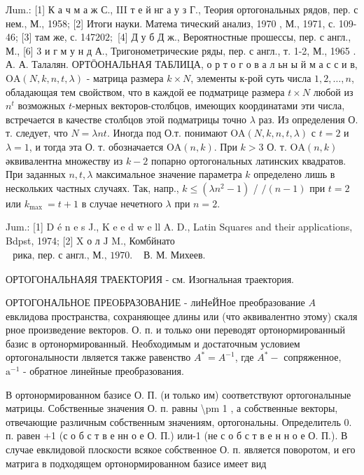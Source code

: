 \documentclass[10pt]{article}
\begin{document}
Лum.: [1] К а ч м а ж С., III т е й нг а у з Г., Теория ортогональных рядов, пер. с нем., М., 1958; [2] Итоги науки. Матема тический анализ, 1970 , М., 1971, с. 109-46; [3] там же, с. 147$202 ;$ [4] Д у б Д ж., Вероятностные прошессы, пер. с англ., М., [6] 3 и г м у н д А., Тригонометрические ряды, пер. с англ., т. 1-2, М., 1965 . А. А. Талалян. ОРТӦОНАЛЬНАЯ ТАБЛИЦА, о р т о г о в а л ьн ы й м а с с и в, $\mathrm{OA}(N, k, n, t, \lambda)$ - матрица размера $k \times N$, элементы к-рой суть числа $1,2, \ldots, n$, обладающая тем свойством, что в каждой ее подматрице размера $t \times N$ любой из $n^{t}$ возможных $t$-мерных векторов-столбцов, имеющих координатами эти числа, встречается в качестве столбцов этой подматрицы точно $\lambda$ раз. Из определения О. т. следует, что $N=\lambda n t$. Иногда под О.т. понимают $\mathrm{OA}(N, k, n, t, \lambda)$ с $t=2$ и $\lambda=1$, и тогда эта О. т. обозначается $\mathrm{OA}(n, k)$. При $k>3$ О. т. $\mathrm{OA}(n, k)$ әквивалентна множеству из $k-2$ попарно ортогональных латинских квадратов. При заданных $n, t, \lambda$ максимальное значение параметра $k$ определено лишь в нескольких частных случаях. Так, напр., $k \leqslant\left(\lambda n^{2}-1\right)$ / $/(n-1)$ при $t=2$ или $k_{\text {max }}=t+1$ в случае нечетного $\lambda$ при $n=2$.



Jum.: [1] D é n e s J., K e e d w e ll A. D., Latin Squares and their applications, Bdpst, 1974; [2] X о л $\mathrm{J}$ M., Комбйнато$\begin{array}{ll}\text { рика, пер. с англ., М., } 1970 . & \text { В. М. Михеев. }\end{array}$



ОРТОГОНАЛЬНАЯЯ ТРАЕКТОРИЯ - см. Изогнальная траектория.



ОРТОГОНАЛЬНОЕ ПРЕОБРАЗОВАНИЕ - лиНеЙНое преобразование $A$ евклидова пространства, сохраняющее длины или (что әквивалентно этому) скаля рное произведение векторов. О. п. и только они переводят ортонормированный базис в ортонормированный. Необходимым и достаточным условием ортогоналыности лвляется также равенство $A^{*}=A^{-1}$, где $A^{*}-$ сопряженное, $\mathrm{a}^{-1}$ - обратное линейные преобразования.



В ортонормированном базисе О. П. (и только им) соответствуют ортогоналыные матрицы. Собственные значения О. п. равны \textbackslash pm 1 , а собственные векторы, отвечающие различным собственным значениям, ортогональны. Определитель 0. п. равен +1 (с о б с т в е нн о е О. П.) или-1 (не с о б с т в е н н о е О. П.). В случае евклидовой плоскости всякое собственное О. п. является поворотом, и его матрига в подходящем ортонормированном базисе имеет вид
\end{document}
